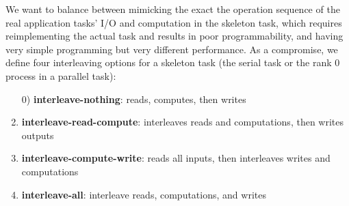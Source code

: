 \documentclass[preprint,12pt]{elsarticle}
\newcommand{\katznote}[1]{ {\textcolor{blue}    { ***Dan:   #1 }}}
\newcommand{\zhaonote}[1]{{\textcolor{darkgreen}{ ***Zhao:  #1 }}}
\newcommand{\katznote}[1]{}
\newcommand{\zhaonote}[1]{}
\begin{document}
We want to balance between mimicking the exact the operation sequence of the real application tasks' I/O and computation in the skeleton task, which requires
reimplementing the actual task and results in poor programmability, and having very simple programming but very different performance. As a compromise,
 we define four interleaving options for a skeleton task (the serial task or the rank 0 process in a parallel task): %
\begin{enumerate}
\item[0)] \textbf{interleave-nothing}: reads, computes, then writes
\item{\textbf{interleave-read-compute}:} interleaves reads and computations, then writes outputs
\item{\textbf{interleave-compute-write}:} reads all inputs, then interleaves writes and computations
\item{\textbf{interleave-all}:} interleave reads, computations, and writes
\end{enumerate}


\end{document}
